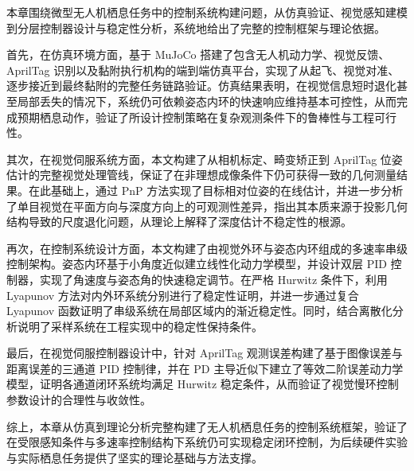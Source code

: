 本章围绕微型无人机栖息任务中的控制系统构建问题，从仿真验证、视觉感知建模到分层控制器设计与稳定性分析，系统地给出了完整的控制框架与理论依据。

首先，在仿真环境方面，基于 MuJoCo 搭建了包含无人机动力学、视觉反馈、AprilTag 识别以及黏附执行机构的端到端仿真平台，实现了从起飞、视觉对准、逐步接近到最终黏附的完整任务链路验证。仿真结果表明，在视觉信息短时退化甚至局部丢失的情况下，系统仍可依赖姿态内环的快速响应维持基本可控性，从而完成预期栖息动作，验证了所设计控制策略在复杂观测条件下的鲁棒性与工程可行性。

其次，在视觉伺服系统方面，本文构建了从相机标定、畸变矫正到 AprilTag 位姿估计的完整视觉处理管线，保证了在非理想成像条件下仍可获得一致的几何测量结果。在此基础上，通过 PnP 方法实现了目标相对位姿的在线估计，并进一步分析了单目视觉在平面方向与深度方向上的可观测性差异，指出其本质来源于投影几何结构导致的尺度退化问题，从理论上解释了深度估计不稳定性的根源。

再次，在控制系统设计方面，本文构建了由视觉外环与姿态内环组成的多速率串级控制架构。姿态内环基于小角度近似建立线性化动力学模型，并设计双层 PID 控制器，实现了角速度与姿态角的快速稳定调节。在严格 Hurwitz 条件下，利用 Lyapunov 方法对内外环系统分别进行了稳定性证明，并进一步通过复合 Lyapunov 函数证明了串级系统在局部区域内的渐近稳定性。同时，结合离散化分析说明了采样系统在工程实现中的稳定性保持条件。

最后，在视觉伺服控制器设计中，针对 AprilTag 观测误差构建了基于图像误差与距离误差的三通道 PID 控制律，并在 PD 主导近似下建立了等效二阶误差动力学模型，证明各通道闭环系统均满足 Hurwitz 稳定条件，从而验证了视觉慢环控制参数设计的合理性与收敛性。

综上，本章从仿真到理论分析完整构建了无人机栖息任务的控制系统框架，验证了在受限感知条件与多速率控制结构下系统仍可实现稳定闭环控制，为后续硬件实验与实际栖息任务提供了坚实的理论基础与方法支撑。